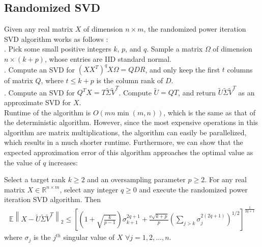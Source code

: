 \subsection{Randomized SVD}

\noindent Given any real matrix $X$ of dimension $n \times m$, the randomized power iteration SVD algorithm works as follows \cite{randomized_svd,random_svd2}:\\



        . Pick some small positive integers $k$, $p$, and $q$. Sample a matrix $\Omega$ of dimension $n \times (k+p)$, whose entries are IID standard normal.\\

 . Compute an SVD for $(XX^T)^{q}X\Omega  = Q DR$, and only keep the first $t$ columns of matrix $Q$, where $ t \leq k+p$ is the column rank of $D$.\\

 . Compute an SVD for $Q^T X = T \widetilde{ \Sigma} \widetilde{ V}^T$. Compute $\widetilde{U}= QT$, and return $\widetilde{ U} \widetilde{ \Sigma} \widetilde{ V}^T$ as an approximate SVD for $X$.\\
 
 
 


 \noindent Runtime of the algorithm is $O(mn \min (m,n))$, which is the same as that of the deterministic algorithm. However, since the most expensive operations in this algorithm are matrix multiplications, the algorithm can easily be parallelized, which results in a much shorter runtime. Furthermore, we can show that the expected approximation error of this algorithm approaches the optimal value as the value of $q$ increases:
 
 
\begin{theorem}Select a target rank $k \geq 2$ and an oversampling parameter $p \geq 2$. For any real matrix $X \in \mathbb{R}^{n \times m}$, select any integer $q \geq 0$ and execute the randomized power iteration SVD algorithm. Then
\begin{align*}
\mathbb { E } \left \| X - \widetilde{ U} \widetilde{\Sigma} \widetilde{V}^{T} \right\|_2 \leq \left [ \left( 1 + \sqrt { \frac { k } { p - 1 } } \right) \sigma _ { k + 1 }^{2q+1} + \frac { \mathrm { e } \sqrt { k + p } } { p } \left( \sum _ { j > k } \sigma _ { j } ^ { 2 (2q+1)} \right) ^ { 1 / 2 } \right ]^{\frac{1}{2q+1}}\tag{4.3} \label{Eq 4.3}
\end{align*}
\noindent where $\sigma_{j}$ is the $j^{th}$ singular value of $X$ $\forall j = 1,2, \ldots, n$.
\end{theorem}


